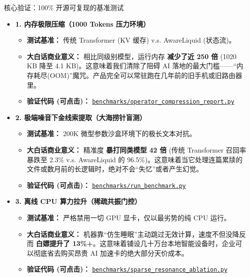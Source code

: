 ﻿\documentclass[aspectratio=169, 10pt]{beamer}
\begin{document}
\begin{frame}{核心验证：100\% 开源可复现的基准测试}
\begin{itemize}
    \item \textbf{1. 内存极限压缩（1000 Tokens 压力环境）}
    \begin{itemize}
        \item \textbf{测试基准：} 传统 Transformer (KV 缓存) v.s. AwareLiquid (状态流)。
        \item \textbf{大白话商业意义：} 相比同级别模型，运行内存 \textbf{减少了近 250 倍} (1020 KB 降至 4.1 KB)。这意味着我们清除了阻碍 AI 落地的最大门槛——“内存耗尽(OOM)”魔咒。产品完全可以常驻跑在几年前的旧手机或旧路由器里。
        \item \textbf{验证代码 (可点击)：} \href{https://github.com/everest-an/M1/blob/main/benchmarks/operator_compression_report.py}{\texttt{benchmarks/operator\_compression\_report.py}}
    \end{itemize}
    \vspace{0.4em}
    \item \textbf{2. 极端噪音下金线索提取（大海捞针盲测）}
    \begin{itemize}
        \item \textbf{测试基准：} 200K 微型参数沙盒环境下的极长文本对抗。
        \item \textbf{大白话商业意义：} 精准度 \textbf{暴打同类模型 42 倍} (传统 Transformer 召回率暴跌至 2.3\% v.s. AwareLiquid 的 96.5\%)。这意味着当它处理连篇累牍的文件或数月前的长逻辑时，绝对不会“失忆”或者产生幻觉。
        \item \textbf{验证代码 (可点击)：} \href{https://github.com/everest-an/M1/blob/main/benchmarks/run_benchmark.py}{\texttt{benchmarks/run\_benchmark.py}}
    \end{itemize}
    \vspace{0.4em}
    \item \textbf{3. 离线 CPU 算力拉升（稀疏共振门控）}
    \begin{itemize}
        \item \textbf{测试基准：} 严格禁用一切 GPU 显卡，仅以最劣势的纯 CPU 运行。
        \item \textbf{大白话商业意义：} 机器靠“仿生睡眠”主动跳过无效计算，速度不但没降反而 \textbf{白嫖提升了 13\%+}。这意味着铺设几十万台本地智能设备时，企业可以彻底省去购买昂贵 AI 加速卡的绝大部分天价成本。
        \item \textbf{验证代码 (可点击)：} \href{https://github.com/everest-an/M1/blob/main/benchmarks/sparse_resonance_ablation.py}{\texttt{benchmarks/sparse\_resonance\_ablation.py}}
    \end{itemize}
\end{itemize}
\end{frame}
\end{document}
